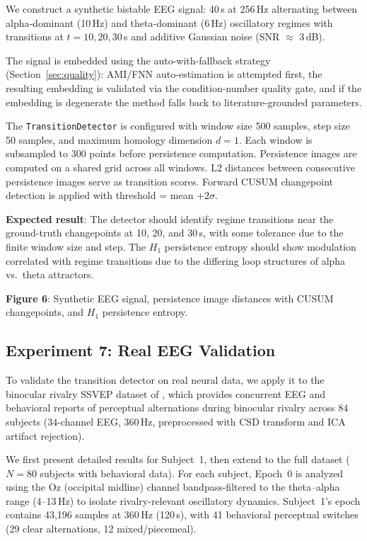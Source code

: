 \documentclass[11pt,a4paper]{article}
\begin{document}
We construct a synthetic bistable EEG signal: 40\,s at 256\,Hz alternating between alpha-dominant (10\,Hz) and theta-dominant (6\,Hz) oscillatory regimes with transitions at $t = 10, 20, 30$\,s and additive Gaussian noise (SNR $\approx$ 3\,dB).

The signal is embedded using the auto-with-fallback strategy (Section~\ref{sec:quality}): AMI/FNN auto-estimation is attempted first, the resulting embedding is validated via the condition-number quality gate, and if the embedding is degenerate the method falls back to literature-grounded parameters.

The \texttt{TransitionDetector} is configured with window size 500 samples, step size 50 samples, and maximum homology dimension $d = 1$.
Each window is subsampled to 300 points before persistence computation.
Persistence images are computed on a shared grid across all windows.
L2 distances between consecutive persistence images serve as transition scores.
Forward CUSUM changepoint detection is applied with threshold = mean $+ 2\sigma$.

\textbf{Expected result}: The detector should identify regime transitions near the ground-truth changepoints at 10, 20, and 30\,s, with some tolerance due to the finite window size and step.
The $H_1$ persistence entropy should show modulation correlated with regime transitions due to the differing loop structures of alpha vs.\ theta attractors.

\textbf{Figure 6}: Synthetic EEG signal, persistence image distances with CUSUM changepoints, and $H_1$ persistence entropy.

\subsection{Experiment 7: Real EEG Validation}\label{sec:exp-real-eeg}

To validate the transition detector on real neural data, we apply it to the binocular rivalry SSVEP dataset of \citet{nie2023accumulating}, which provides concurrent EEG and behavioral reports of perceptual alternations during binocular rivalry across 84 subjects (34-channel EEG, 360\,Hz, preprocessed with CSD transform and ICA artifact rejection).

We first present detailed results for Subject~1, then extend to the full dataset ($N = 80$ subjects with behavioral data).
For each subject, Epoch~0 is analyzed using the Oz (occipital midline) channel bandpass-filtered to the theta--alpha range (4--13\,Hz) to isolate rivalry-relevant oscillatory dynamics.
Subject~1's epoch contains 43{,}196 samples at 360\,Hz (120\,s), with 41 behavioral perceptual switches (29 clear alternations, 12 mixed/piecemeal).
\end{document}
